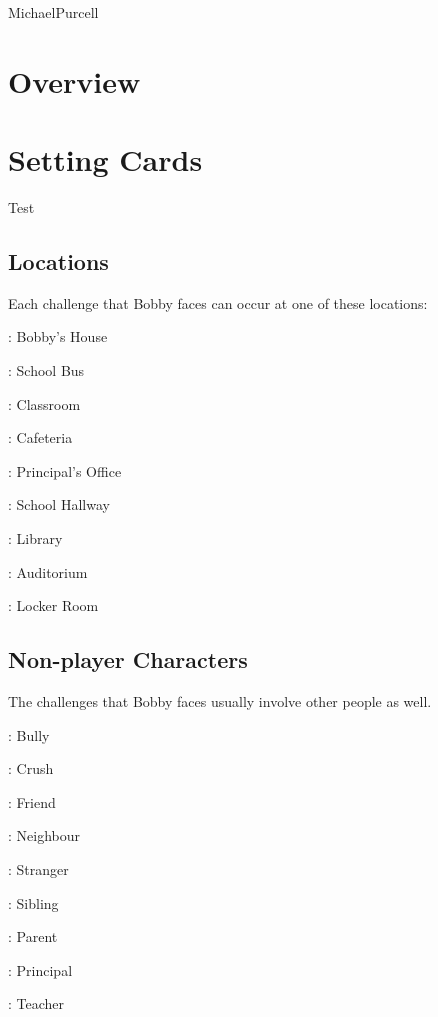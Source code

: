 \documentclass[a4paper, 10pt,notumble]{leaflet}
\DeclareRobustCommand\spades[1][black]{\textcolor{#1}{\cardfont{\}}}}
\DeclareRobustCommand\hearts[1][red]{\textcolor{#1}{{\cardfont{\{}}}}
\DeclareRobustCommand\diamonds[1][red]{\textcolor{#1}{{\cardfont{[}}}}
\DeclareRobustCommand\clubs[1][black]{\textcolor{#1}{\cardfont{]}}}
\DeclareRobustCommand\jack[1][black]{\textcolor{#1}{\cardfont{J}}}
\DeclareRobustCommand\queen[1][black]{\textcolor{#1}{\cardfont{Q}}}
\DeclareRobustCommand\king[1][black]{\textcolor{#1}{\cardfont{K}}}
\DeclareRobustCommand\redtwo[1][red]{\textcolor{#1}{\cardfont{2}}}
\DeclareRobustCommand\redthree[1][red]{\textcolor{#1}{\cardfont{3}}}
\DeclareRobustCommand\redfour[1][red]{\textcolor{#1}{\cardfont{4}}}
\DeclareRobustCommand\redfive[1][red]{\textcolor{#1}{\cardfont{5}}}
\DeclareRobustCommand\redsix[1][red]{\textcolor{#1}{\cardfont{6}}}
\DeclareRobustCommand\redseven[1][red]{\textcolor{#1}{\cardfont{7}}}
\DeclareRobustCommand\redeight[1][red]{\textcolor{#1}{\cardfont{8}}}
\DeclareRobustCommand\rednine[1][red]{\textcolor{#1}{\cardfont{9}}}
\DeclareRobustCommand\redten[1][red]{\textcolor{#1}{\cardfont{=}}}
\DeclareRobustCommand\redjack[1][red]{\textcolor{#1}{\cardfont{J}}}
\DeclareRobustCommand\redqueen[1][red]{\textcolor{#1}{\cardfont{Q}}}
\DeclareRobustCommand\redking[1][red]{\textcolor{#1}{\cardfont{K}}}
\begin{document}
\vfill

\setmainfont[Scale=1.5]{Charter}
\begin{center}
\LARGE
Michael\phantom{y}Purcell
\end{center}

\newpage

\setmainfont{Charter}
\raggedright
\section{Overview}

\newpage

\section{Setting Cards}
Test

\subsection{Locations}
Each challenge that Bobby faces can occur at one of these locations:
\begin{cardlist}
  \item[\redtwo\diamonds:] Bobby's House
  \item[\redthree\diamonds:] School Bus
  \item[\redfour\diamonds:] Classroom
  \item[\redfive\diamonds:] Cafeteria
  \item[\redsix\diamonds:] Principal's Office
  \item[\redseven\diamonds:] School Hallway
  \item[\redeight\diamonds:] Library
  \item[\rednine\diamonds:] Auditorium
  \item[\redten\diamonds:] Locker Room
\end{cardlist}

\subsection{Non-player Characters}
The challenges that Bobby faces usually involve other people as well.
\begin{cardlist}
  \item[\redjack\diamonds:] Bully
  \item[\redqueen\diamonds:] Crush
  \item[\redking\diamonds:] Friend
\medskip
  \item[\queen\clubs:] Neighbour
  \item[\king\clubs:] Stranger
\medskip
  \item[\redjack\hearts:] Sibling
  \item[\redking\hearts:] Parent
\medskip
  \item[\jack\spades:] Principal
  \item[\queen\spades:] Teacher
\end{cardlist}
\end{document}
